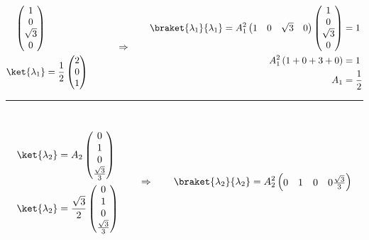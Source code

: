 \documentclass{article}
\begin{document}
\begin{enumerate}
\begin{equation}
\begin{split}
\begin{pmatrix}
					1 \\
					0 \\
					\sqrt{3} \\
					0
				\end{pmatrix} \\
				\ket{\lambda_1} &= \frac{1}{2} \begin{pmatrix}
						2 \\
						0 \\
						1
				\end{pmatrix}
			\end{split}
			\qquad \Rightarrow \qquad
			\begin{split}
				\braket{\lambda_1}{\lambda_1} = A_1^2 \begin{pmatrix}
					1 & 0 & \sqrt{3} & 0
				\end{pmatrix}
				\begin{pmatrix}
					1 \\
					0 \\
					\sqrt{3} \\
					0
				\end{pmatrix} &= 1 \\
				A_1^2 \left( 1 + 0 + 3 + 0 \right) &= 1 \\
				A_1 &= \frac{1}{2}
			\end{split}
		\end{equation}
		\noindent\hfil\rule{0.5\textwidth}{.4pt}\hfil \\
		\begin{equation}
			\begin{split}
				\ket{\lambda_2} &= A_2 \begin{pmatrix}
					0 \\
					1 \\
					0 \\
					\frac{\sqrt{3}}{3}
				\end{pmatrix} \\
				\ket{\lambda_2} &= \frac{\sqrt{3}}{2} \begin{pmatrix}
					0 \\
					1 \\
					0 \\
					\frac{\sqrt{3}}{3}
				\end{pmatrix}
			\end{split}
			\qquad \Rightarrow \qquad
			\begin{split}
				\braket{\lambda_2}{\lambda_2} = A_2^2 \begin{pmatrix}
					0 & 1 & 0 & 0 \frac{\sqrt{3}}{3}
				\end{pmatrix}

\end{split}
\end{equation}
\end{enumerate}
\end{document}
